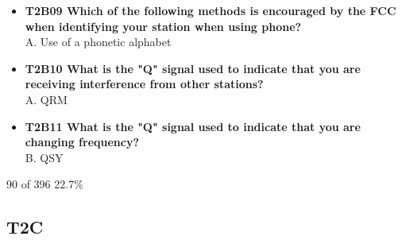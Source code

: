 \documentclass[10pt]{beamer}
\begin{document}
\begin{frame}
\begin{itemize}[<+->]
\item\textbf{T2B09 Which of the following methods is encouraged by the FCC when identifying your station when using phone?}\\ A. Use of a phonetic alphabet
\item\textbf{T2B10 What is the "Q" signal used to indicate that you are receiving interference from other stations?}\\ A. QRM
\item\textbf{T2B11 What is the "Q" signal used to indicate that you are changing frequency?}\\ B. QSY
\end{itemize}
\tiny 90 of 396 22.7\%
\end{frame}

\subsection{T2C}
\end{document}
